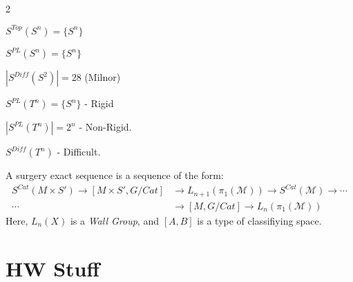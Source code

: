 \documentclass{book}                                                           %
\begin{document}
                \begin{example}
                    \
                    \begin{enumerate}
                    \end{enumerate}
                \end{example}
                A surgery exact sequence is a sequence of the form:
                \begin{align*}
                    S^{Cat}(M\times S')\rightarrow[M\times S',G/Cat]
                    &\rightarrow L_{n+1}(\pi_{1}(\mathcal{M}))
                    \rightarrow{S^{Cat}}(\mathcal{M})
                    \rightarrow\cdots\\
                    \cdots
                    &\rightarrow{[M,G/Cat]}
                    \rightarrow{L_{n}}(\pi_{1}(\mathcal{M}))
                \end{align*}
                Here, $L_{n}(X)$ is a \textit{Wall Group},
                and $[A,B]$ is a type of classifiying space.
\chapter{HW Stuff}
\end{document}
